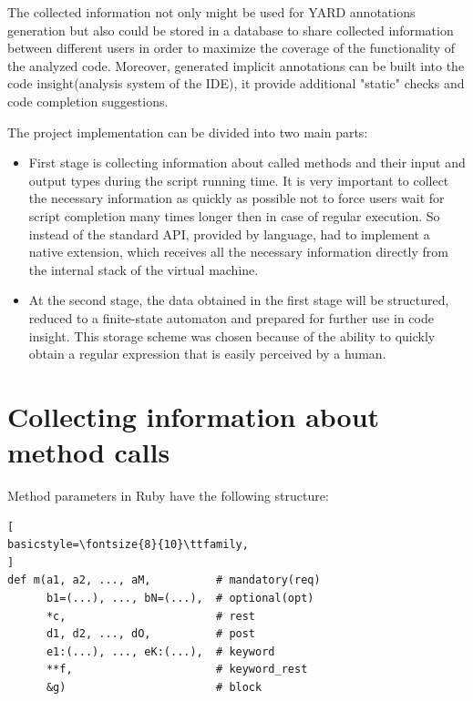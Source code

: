 \documentclass[conference]{IEEEtran}
\begin{document}
The collected information not only might be used for YARD annotations generation but also could be stored in a database
to share collected information between different users in order to maximize the coverage of the functionality of the
analyzed code. Moreover, generated implicit annotations can be built into the code insight(analysis system of the
IDE\cite{Control_flow_analysis_in_scheme}), it provide additional "static" checks and code completion suggestions.

The project implementation can be divided into two main parts:
\begin{itemize}  
  \item First stage is collecting information about called methods and their input and output types during the script
    running time. It is very important to collect the necessary information as quickly as possible not to force users
    wait for script completion many times longer then in case of regular execution. So instead of the standard API,
    provided by language, had to implement a native extension, which receives all the necessary information directly
    from the internal stack of the virtual machine.

  \item At the second stage, the data obtained in the first stage will be structured, reduced to a finite-state
    automaton and prepared for further use in code insight. This storage scheme was chosen because of the ability to
    quickly obtain a regular expression that is easily perceived by a human.
\end{itemize}

\section{Collecting information about method calls}
Method parameters in Ruby have the following structure:
\begin{lstlisting}[
basicstyle=\fontsize{8}{10}\ttfamily,
]
def m(a1, a2, ..., aM,          # mandatory(req)
      b1=(...), ..., bN=(...),  # optional(opt)
      *c,                       # rest
      d1, d2, ..., dO,          # post
      e1:(...), ..., eK:(...),  # keyword
      **f,                      # keyword_rest
      &g)                       # block
\end{lstlisting}
\end{document}
